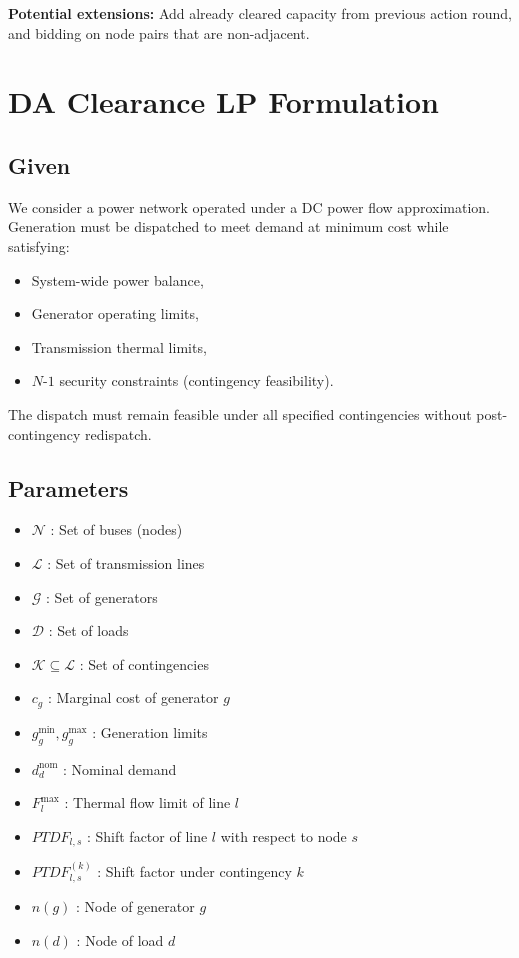 \documentclass[11pt]{article}
\begin{document}
\textbf{Potential extensions:} Add already cleared capacity from previous action round, and bidding on node pairs that are non-adjacent.

\section{DA Clearance LP Formulation}

\subsection{Given}

We consider a power network operated under a DC power flow approximation.
Generation must be dispatched to meet demand at minimum cost while satisfying:

\begin{itemize}
    \item System-wide power balance,
    \item Generator operating limits,
    \item Transmission thermal limits,
    \item $N$-$1$ security constraints (contingency feasibility).
\end{itemize}

The dispatch must remain feasible under all specified contingencies without post-contingency redispatch.

\subsection{Parameters}

\begin{itemize}
    \item $\mathcal{N}$ : Set of buses (nodes)
    \item $\mathcal{L}$ : Set of transmission lines
    \item $\mathcal{G}$ : Set of generators
    \item $\mathcal{D}$ : Set of loads
    \item $\mathcal{K} \subseteq \mathcal{L}$ : Set of contingencies
    \item $c_g$ : Marginal cost of generator $g$
    \item $g_g^{\min}, g_g^{\max}$ : Generation limits
    \item $d_d^{\text{nom}}$ : Nominal demand
    \item $F_l^{\max}$ : Thermal flow limit of line $l$
    \item $PTDF_{l,s}$ : Shift factor of line $l$ with respect to node $s$
    \item $PTDF_{l,s}^{(k)}$ : Shift factor under contingency $k$
    \item $n(g)$ : Node of generator $g$
    \item $n(d)$ : Node of load $d$
\end{itemize}
\end{document}
